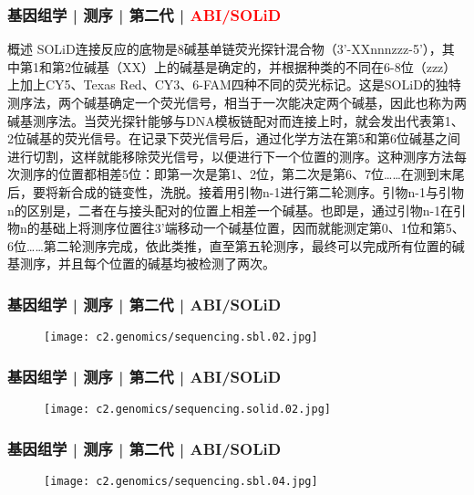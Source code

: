 \begin{frame}
  \frametitle{基因组学 | 测序 | 第二代 | \textcolor{red}{ABI/SOLiD}}
  \begin{block}{概述}
SOLiD连接反应的底物是8碱基单链荧光探针混合物（3'-XXnnnzzz-5'），其中第1和第2位碱基（XX）上的碱基是确定的，并根据种类的不同在6-8位（zzz）上加上CY5、Texas Red、CY3、6-FAM四种不同的荧光标记。这是SOLiD的独特测序法，两个碱基确定一个荧光信号，相当于一次能决定两个碱基，因此也称为两碱基测序法。当荧光探针能够与DNA模板链配对而连接上时，就会发出代表第1、2位碱基的荧光信号。在记录下荧光信号后，通过化学方法在第5和第6位碱基之间进行切割，这样就能移除荧光信号，以便进行下一个位置的测序。这种测序方法每次测序的位置都相差5位：即第一次是第1、2位，第二次是第6、7位……在测到末尾后，要将新合成的链变性，洗脱。接着用引物n-1进行第二轮测序。引物n-1与引物n的区别是，二者在与接头配对的位置上相差一个碱基。也即是，通过引物n-1在引物n的基础上将测序位置往3'端移动一个碱基位置，因而就能测定第0、1位和第5、6位……第二轮测序完成，依此类推，直至第五轮测序，最终可以完成所有位置的碱基测序，并且每个位置的碱基均被检测了两次。
  \end{block}
\end{frame}

\begin{frame}
  \frametitle{基因组学 | 测序 | 第二代 | ABI/SOLiD}
  \begin{figure}
    \centering
    \texttt{[image: c2.genomics/sequencing.sbl.02.jpg]}
  \end{figure}
\end{frame}


\begin{frame}
  \frametitle{基因组学 | 测序 | 第二代 | ABI/SOLiD}
  \begin{figure}
    \centering
    \texttt{[image: c2.genomics/sequencing.solid.02.jpg]}
  \end{figure}
\end{frame}

\begin{frame}
  \frametitle{基因组学 | 测序 | 第二代 | ABI/SOLiD}
  \begin{figure}
    \centering
    \texttt{[image: c2.genomics/sequencing.sbl.04.jpg]}
  \end{figure}
\end{frame}

